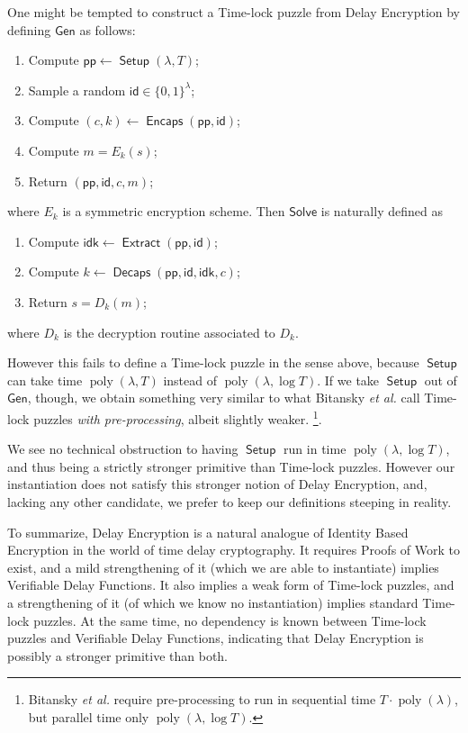 \documentclass{llncs}
\DeclareMathOperator{\poly}{poly}
\DeclareMathOperator{\Setup}{\mathsf{Setup}}
\DeclareMathOperator{\Extract}{\mathsf{Extract}}
\DeclareMathOperator{\Encaps}{\mathsf{Encaps}}
\DeclareMathOperator{\Decaps}{\mathsf{Decaps}}
\newcommand{\pp}{\mathsf{pp}}
\newcommand{\id}{\mathsf{id}}
\newcommand{\idk}{\mathsf{idk}}
\begin{document}
One might be tempted to construct a Time-lock puzzle from Delay
Encryption by defining $\mathsf{Gen}$ as follows:
\begin{enumerate}
\item Compute $\pp \gets \Setup(\lambda,T)$;
\item Sample a random $\id\in\{0,1\}^\lambda$;
\item Compute $(c,k) \gets \Encaps(\pp, \id)$;
\item Compute $m = E_k(s)$;
\item Return $(\pp,\id,c,m)$;
\end{enumerate}
where $E_k$ is a symmetric encryption scheme. %
Then $\mathsf{Solve}$ is naturally defined as
\begin{enumerate}
\item Compute $\idk \gets \Extract(\pp,\id)$;
\item Compute $k \gets \Decaps(\pp,\id,\idk,c)$;
\item Return $s = D_k(m)$;
\end{enumerate}
where $D_k$ is the decryption routine associated to $D_k$. %

However this fails to define a Time-lock puzzle in the sense above,
because $\Setup$ can take time $\poly(\lambda,T)$ instead of
$\poly(\lambda,\log T)$. %
If we take $\Setup$ out of $\mathsf{Gen}$, though, we obtain something
very similar to what Bitansky \emph{et al.} call Time-lock puzzles
\emph{with pre-processing}, albeit slightly weaker.%
\footnote{Bitansky \emph{et al.} require pre-processing to run in
  sequential time $T\cdot\poly(\lambda)$, but parallel time only
  $\poly(\lambda,\log T)$.}.

We see no technical obstruction to having $\Setup$ run in time
$\poly(\lambda,\log T)$, and thus being a strictly stronger primitive
than Time-lock puzzles. %
However our instantiation does not satisfy this stronger notion of
Delay Encryption, and, lacking any other candidate, we prefer to keep
our definitions steeping in reality.

\medskip

To summarize, Delay Encryption is a natural analogue of Identity Based
Encryption in the world of time delay cryptography. %
It requires Proofs of Work to exist, and a mild strengthening of it
(which we are able to instantiate) implies Verifiable Delay
Functions. %
It also implies a weak form of Time-lock puzzles, and a strengthening
of it (of which we know no instantiation) implies standard Time-lock
puzzles. %
At the same time, no dependency is known between Time-lock puzzles and
Verifiable Delay Functions, indicating that Delay Encryption is
possibly a stronger primitive than both.
\end{document}
